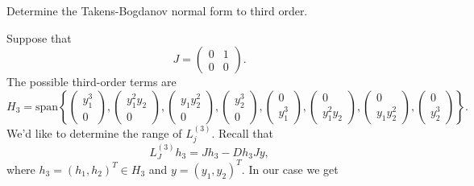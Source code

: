\documentclass[12pt]{report}
\begin{document}
\newpage



\begin{problem}
    Determine the Takens-Bogdanov normal form to third order. 
\end{problem}

\begin{solution}

    \noindent
    Suppose that 
    \[
        J = \begin{pmatrix}
            0 & 1 \\ 0 & 0
        \end{pmatrix}.
    \]
    The possible third-order terms are 
    \[ 
        H_3 = \text{span}\left\{\begin{pmatrix}
            y_1^3\\0
        \end{pmatrix},\begin{pmatrix}
            y_1^2y_2\\0
        \end{pmatrix},\begin{pmatrix}
            y_1y_2^2\\0
        \end{pmatrix},
        \begin{pmatrix}
            y_2^3\\0
        \end{pmatrix},
        \begin{pmatrix}
            0\\y_1^3
        \end{pmatrix},\begin{pmatrix}
            0\\y_1^2y_2
        \end{pmatrix},\begin{pmatrix}
            0\\y_1y_2^2
        \end{pmatrix},
        \begin{pmatrix}
            0\\y_2^3
        \end{pmatrix}\right\}.
    \]    
    We'd like to determine the range of $L_j^{(3)}$. Recall that 
    \[
        L_J^{(3)}h_3 = Jh_3 - Dh_3Jy,
    \]
    where $h_3 = (h_1,h_2)^T \in H_3$ and $y = (y_1,y_2)^T$. In our case we get

\end{solution}
\end{document}
